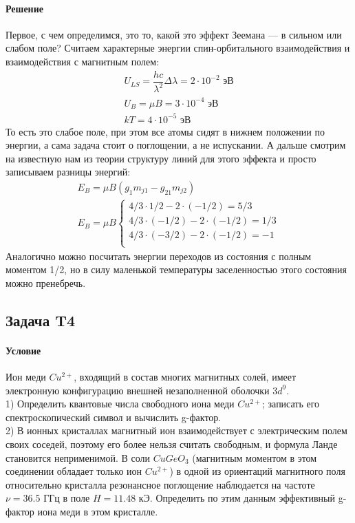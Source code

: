 \documentclass[12pt]{article}
\begin{document}
\paragraph{Решение}
Первое, с чем определимся, это то, какой это эффект Зеемана --- в сильном или слабом поле? Считаем характерные энергии спин-орбитального взаимодействия и взаимодействия с магнитным полем:
\begin{gather*}
    U_{LS} = \dfrac{hc}{\lambda^2}\Delta \lambda = 2\cdot 10^{-2} \text{ эВ}\\
    U_B = \mu B = 3\cdot 10^{-4} \text{ эВ}\\
    kT = 4\cdot 10^{-5} \text{ эВ}
\end{gather*}
То есть это слабое поле, при этом все атомы сидят в нижнем положении по энергии, а сама задача стоит о поглощении, а не испускании. А дальше смотрим на известную нам из теории структуру линий для этого эффекта и просто записываем разницы энергий:
\begin{gather*}
    E_B=\mu B(g_1m_{j1} - g_21m_{j2})\\
    E_B = \mu B 
    \begin{cases}
    4/3 \cdot 1/2 - 2\cdot(-1/2) = 5/3\\
    4/3 \cdot (-1/2) - 2\cdot(-1/2) = 1/3\\
    4/3 \cdot (-3/2) - 2\cdot(-1/2) = -1\\
    \end{cases}
\end{gather*}
Аналогично можно посчитать энергии переходов из состояния с полным моментом 1/2, но в силу маленькой температуры заселенностью этого состояния можно пренебречь.


\subsection{Задача T4}
\label{task_t4}
\paragraph{Условие}
Ион меди $Cu^{2+}$, входящий в состав многих магнитных солей, имеет электронную конфигурацию внешней незаполненной оболочки $3d^9$.\\
1) Определить квантовые числа свободного иона меди $Cu^{2+}$; записать его спектроскопический символ и вычислить g-фактор.\\
2) В ионных кристаллах магнитный ион взаимодействует с электрическим полем своих соседей, поэтому его более нельзя считать свободным, и формула Ланде становится неприменимой. В соли $CuGeO_3$ (магнитным моментом в этом соединении обладает только ион $Cu^{2+}$) в одной из ориентаций магнитного поля относительно кристалла резонансное поглощение наблюдается на частоте $\nu = 36.5$ ГГц в поле $H = 11.48$ кЭ. Определить по этим данным эффективный g-фактор иона меди в этом кристалле.
\end{document}
